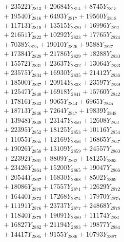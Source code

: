 \documentclass[a4paper,10pt]{article}
\begin{document}
{\begin{align}
&\;  + 23522 Y_{2813} + 20684 Y_{2814} + 8745 Y_{2815} \\[0.3ex]
&\;  + 19540 Y_{2816} + 6493 Y_{2817} + 19560 Y_{2818} \\[0.5ex]\allowbreak
&\;  + 11713 Y_{2819} + 13515 Y_{2820} + 16996 Y_{2821} \\[0.3ex]
&\;  + 21651 Y_{2822} + 10292 Y_{2823} + 17765 Y_{2824} \\[0.3ex]
&\;  + 7038 Y_{2825} + 19010 Y_{2826} + 9588 Y_{2827} \\[0.3ex]
&\;  + 17384 Y_{2828} + 21786 Y_{2829} + 18288 Y_{2830} \\[0.3ex]
&\;  + 15572 Y_{2831} + 23637 Y_{2832} + 13064 Y_{2833} \\[0.3ex]
&\;  + 23575 Y_{2834} + 16930 Y_{2835} + 21412 Y_{2836} \\[0.3ex]
&\;  + 18500 Y_{2837} + 20914 Y_{2838} + 23597 Y_{2839} \\[0.3ex]
&\;  + 12547 Y_{2840} + 16918 Y_{2841} + 15760 Y_{2842} \\[0.3ex]
&\;  + 17816 Y_{2843} + 9065 Y_{2844} + 6965 Y_{2845} \\[0.3ex]
&\;  + 18713 Y_{2846} + 7264 Y_{2847} + 19839 Y_{2848} \\[0.5ex]\allowbreak
&\;  + 13948 Y_{2849} + 23147 Y_{2850} + 12608 Y_{2851} \\[0.3ex]
&\;  + 22395 Y_{2852} + 18125 Y_{2853} + 10116 Y_{2854} \\[0.3ex]
&\;  + 11055 Y_{2855} + 12169 Y_{2856} + 16865 Y_{2857} \\[0.3ex]
&\;  + 19026 Y_{2858} + 13109 Y_{2859} + 24557 Y_{2860} \\[0.3ex]
&\;  + 22392 Y_{2861} + 8809 Y_{2862} + 18125 Y_{2863} \\[0.3ex]
&\;  + 23426 Y_{2864} + 15200 Y_{2865} + 19047 Y_{2866} \\[0.3ex]
&\;  + 20544 Y_{2867} + 16830 Y_{2868} + 8502 Y_{2869} \\[0.3ex]
&\;  + 18086 Y_{2870} + 17557 Y_{2871} + 12629 Y_{2872} \\[0.3ex]
&\;  + 16440 Y_{2873} + 17268 Y_{2874} + 17970 Y_{2875} \\[0.3ex]
&\;  + 11191 Y_{2876} + 23737 Y_{2877} + 24868 Y_{2878} \\[0.5ex]\allowbreak
&\;  + 11840 Y_{2879} + 19091 Y_{2880} + 11174 Y_{2881} \\[0.3ex]
&\;  + 16827 Y_{2882} + 21194 Y_{2883} + 19877 Y_{2884} \\[0.3ex]
&\;  + 14417 Y_{2885} + 9155 Y_{2886} + 10793 Y_{2887} \\[0.3ex]

\end{align}}
\end{document}

